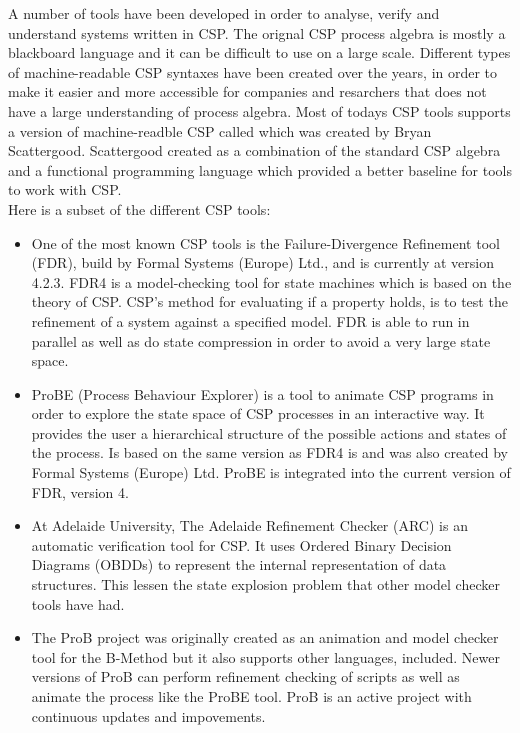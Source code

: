 A number of tools have been developed in order to analyse, verify and understand systems written in CSP. The orignal CSP process algebra is mostly a blackboard language and it can be difficult to use on a large scale. Different types of machine-readable CSP syntaxes have been created over the years, in order to make it easier and more accessible for companies and resarchers that does not have a large understanding of process algebra. Most of todays CSP tools supports a version of machine-readble CSP called \cspm{}  which was created by Bryan Scattergood\cite{Scattergood1998}. Scattergood created \cspm{}  as a combination of the standard CSP algebra and a functional programming language which provided a better baseline for tools to work with CSP.\\
Here is a subset of the different CSP tools:
\begin{itemize}
\item One of the most known CSP tools is the Failure-Divergence Refinement tool (FDR), build by Formal Systems (Europe) Ltd., and is currently at version 4.2.3\cite{fdr}. FDR4 is a model-checking tool for state machines which is based on the theory of CSP. CSP's method for evaluating if a property holds, is to test the refinement of a system against a specified model.
FDR is able to run in parallel as well as do state compression in order to avoid a very large state space.
\item ProBE (Process Behaviour Explorer)\cite{probe} is a tool to animate CSP programs in order to explore the state space of CSP processes in an interactive way. It provides the user a hierarchical structure of the possible actions and states of the process.
Is based on the same \cspm{}  version as FDR4 is and was also created by Formal Systems (Europe) Ltd. ProBE is integrated into the current version of FDR, version 4.
\item At Adelaide University, The Adelaide Refinement Checker (ARC)\cite{Parashkevov1996} is an automatic verification tool for CSP. It uses Ordered Binary Decision Diagrams (OBDDs) to represent the internal representation of data structures. This lessen the state explosion problem that other model checker tools have had.
\item The ProB project\cite{ProB}\cite{Leuschel2003} was originally created as an animation and model checker tool for the B-Method\cite{Abrial1988} but it also supports other languages, \cspm{}  included. Newer versions of ProB can perform refinement checking of \cspm{}  scripts as well as animate the process like the ProBE tool. ProB is an active project with continuous updates and impovements.

\end{itemize}
